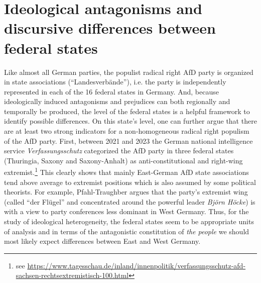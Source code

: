 \documentclass[a4paper]{scrreprt}
\begin{document}
\section{Ideological antagonisms and discursive differences between federal states}
Like almost all German parties, the populist radical right AfD party is organized in state associations (``Landesverbände''), i.e. the party is independently represented in each of the 16 federal states in Germany. And, because ideologically induced antagonisms and prejudices can both regionally and temporally be produced, the level of the federal states is a helpful framework to identify possible differences. On this state's level, one can further argue that there are at least two strong indicators for a non-homogeneous radical right populism of the AfD party. First, between 2021 and 2023 the German national intelligence service {\em Verfassungsschutz} categorized the AfD party in three federal states (Thuringia, Saxony and Saxony-Anhalt) as anti-constitutional and right-wing extremist.\footnote{see \url{https://www.tagesschau.de/inland/innenpolitik/verfassungsschutz-afd-sachsen-rechtsextremistisch-100.html}} This clearly shows that mainly East-German AfD state associations tend above average to extremist positions which is also assumed by some political theorists. For example, Pfahl-Traughber argues that the party's extremist wing (called ``der Flügel'' and concentrated around the powerful leader {\em Björn Höcke}) is with a view to party conferences less dominant in West Germany. \cite[p.~37]{pfahl:2019} Thus, for the study of ideological heterogeneity, the federal states seem to be appropriate units of analysis and in terms of the antagonistic constitution of {\em the people} we should most likely expect differences between East and West Germany.\par
\end{document}
